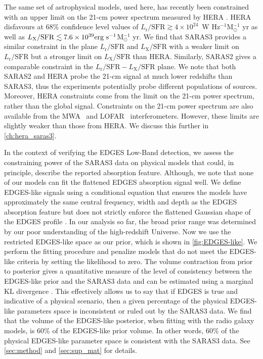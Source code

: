 The same set of astrophysical models, used here, has recently been constrained with an upper limit on the 21-cm power spectrum measured by HERA  \cite{HERA_2022b}. HERA disfavours at 68\% confidence level values of $L_\mathrm{r}/\mathrm{SFR} \gtrsim 4\times10^{24}$~W Hz$^{-1}$M$_\odot^{-1}$ yr as well as $L_\mathrm{X}/\mathrm{SFR} \lesssim 7.6\times10^{39}\textnormal{erg~s}^{-1}$M$_\odot^{-1}$ yr. We find that SARAS3 provides a similar constraint in the plane $L_\mathrm{r}/\mathrm{SFR}$ and $L_\mathrm{X}/\mathrm{SFR}$ with a weaker limit on $L_\mathrm{r}/\mathrm{SFR}$ but a stronger limit on $L_\mathrm{X}/\mathrm{SFR}$ than HERA. Similarly, SARAS2 gives a comparable constraint in the $L_\mathrm{r}/\mathrm{SFR}- L_\mathrm{X}/\mathrm{SFR}$ plane. We note that both SARAS2 and HERA probe the 21-cm signal at much lower redshifts than SARAS3, thus the experiments potentially probe different populations of sources. Moreover,  HERA constraints come from the limit on the 21-cm power spectrum, rather than the global signal. Constraints on the 21-cm power spectrum are also available from the MWA~\cite{Trott_mwa_2020, Ghara_MWA_2021} and LOFAR~\cite{Gehlot_lofar_2019, Mondal_LOFAR_2020, Greig_LOFAR_2021} interferometers. However, these limits are slightly weaker than those from HERA. We discuss this further in \cref{ch:hera_saras3}.

In the context of verifying the EDGES Low-Band detection, we assess the constraining power of the SARAS3 data on physical models that could, in principle, describe the reported absorption feature. Although, we note that none of our models can fit the flattened EDGES absorption signal well. We define EDGES-like signals using a conditional equation that ensures the models have approximately the same central frequency, width and depth as the EDGES absorption feature but does not strictly enforce the flattened Gaussian shape of the EDGES profile \cite{Fialkov2019, Reis_sta_2021}. In our analysis so far, the broad prior range was determined by our poor understanding of the high-redshift Universe. Now we use the restricted EDGES-like space as our prior, which is shown in \cref{fig:EDGES-like}.
We perform the fitting procedure and penalize models that do not meet the EDGES-like criteria by setting the likelihood to zero. The volume contraction from prior to posterior gives a quantitative measure of the level of consistency between the EDGES-like prior and the SARAS3 data and can be estimated using a marginal KL divergence \cite{kullback_information_1951}. This effectively allows us to say that if EDGES is true and indicative of a physical scenario, then a given percentage of the physical EDGES-like parameters space is inconsistent or ruled out by the SARAS3 data. We find that the volume of the EDGES-like posterior, when fitting with the radio galaxy models, is 60\% of the EDGES-like prior volume. In other words, 60\% of the physical EDGES-like parameter space is consistent with the SARAS3 data. See \cref{sec:method} and \cref{sec:sup_mat} for details.

